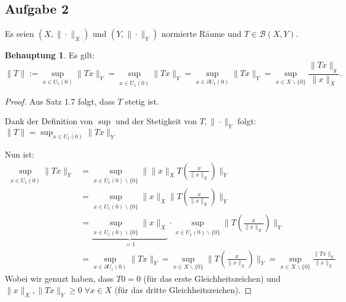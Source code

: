 \documentclass[ngerman]{report}
\theoremstyle{plain}%
\theoremstyle{definition}%
\theoremstyle{myStyle}
\newtheorem*{beh}{Behauptung}
\newcommand{\B}{\mathcal{B}} %
\begin{document}
\subsection{Aufgabe 2}
Es seien $(X,\|\cdot\|_X)$ und $(Y,\|\cdot\|_Y)$ normierte Räume und $T\in \B(X,Y)$.
\begin{beh}
	Es gilt:
	$$\|T\|:=\sup_{x\in U_1(0)} \|Tx\|_Y = \sup_{x\in\overline{U_1(0)}}\|Tx\|_Y = \sup_{x\in \partial U_1(0)} \|Tx\|_Y = \sup_{x\in X\backslash \{0\}} \frac{\|Tx\|_y}{\|x\|_X}.$$
\end{beh}
\begin{proof}
	Aus Satz 1.7 folgt, dass $T$ stetig ist. \par 
	Dank der Definition von $\sup$ und der Stetigkeit von $T,\|\cdot \|_Y$ folgt: $\displaystyle \|T\|=\sup_{x\in\overline{U_1(0)}}\|Tx\|_Y$ \par 
	Nun ist: 
	\begin{equation*}
\begin{split}
\sup_{x\in\overline{U_1(0)}}\|Tx\|_Y & = \sup_{x\in\overline{U_1(0)}\backslash\{0\}}\|\|x\|_X T\left(\frac{x}{\|x\|_X}\right)\|_Y
\\ & = \sup_{x\in\overline{U_1(0)}\backslash\{0\}}\|x\|_X \|T\left(\frac{x}{\|x\|_X}\right)\|_Y
\\ & = \underbrace{\sup_{x\in\overline{U_1(0)}\backslash\{0\}}\|x\|_X}_{=1}
	   \cdot \sup_{x\in\overline{U_1(0)}\backslash\{0\}} \|T\left(\frac{x}{\|x\|_X}\right)\|_Y
\\ & = \sup_{x\in \partial U_1(0)} \|Tx\|_Y  =
	\sup_{x\in X\backslash\{0\}} \|T\left(\frac{x}{\|x\|_X}\right)\|_Y
 = \sup_{x\in X\backslash\{0\}} \frac{\|Tx\|_Y}{\|x\|_X}
\end{split}
\end{equation*}
Wobei wir genuzt haben, dass $T0 = 0$ (für das erste Gleichheitszeichen) und $\|x\|_X,\|Tx\|_Y\geq 0\;\forall x\in X$ (für das dritte Gleichheitszeichen). 
\end{proof}
\end{document}
